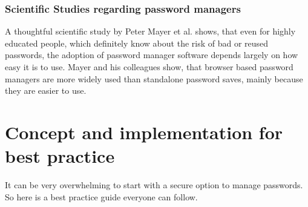 \documentclass[conference]{IEEEtran}
\begin{document}
\subsubsection{Scientific Studies regarding password managers}
A thoughtful scientific study by Peter Mayer et al. shows, that even for highly educated people, which definitely know about the risk of bad or reused passwords, the adoption of password manager software depends largely on how easy it is to use. Mayer and his colleagues show, that browser based password managers are more widely used than standalone password saves, mainly because they are easier to use.\cite{b13}

\section{Concept and implementation for best practice}
It can be very overwhelming to start with a secure option to manage passwords. So here is a best practice guide everyone can follow.
\end{document}
